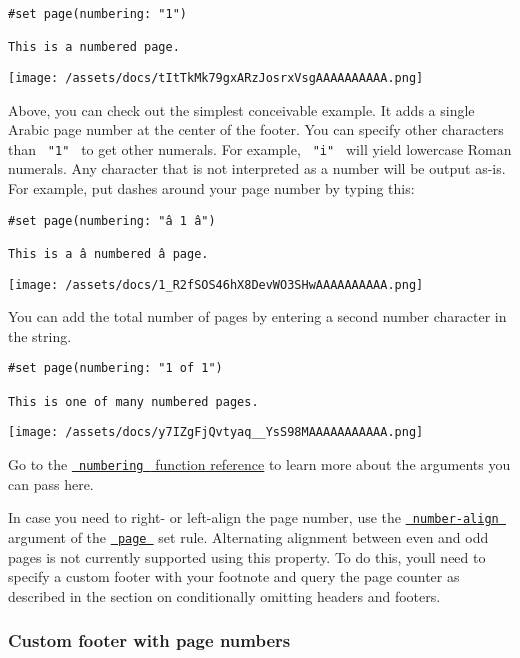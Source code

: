\begin{verbatim}
#set page(numbering: "1")

This is a numbered page.
\end{verbatim}

\texttt{[image: /assets/docs/tItTkMk79gxARzJosrxVsgAAAAAAAAAA.png]}

Above, you can check out the simplest conceivable example. It adds a
single Arabic page number at the center of the footer. You can specify
other characters than \texttt{\ "1"\ } to get other numerals. For
example, \texttt{\ "i"\ } will yield lowercase Roman numerals. Any
character that is not interpreted as a number will be output as-is. For
example, put dashes around your page number by typing this:

\begin{verbatim}
#set page(numbering: "â 1 â")

This is a â numbered â page.
\end{verbatim}

\texttt{[image: /assets/docs/1\_R2fSOS46hX8DevWO3SHwAAAAAAAAAA.png]}

You can add the total number of pages by entering a second number
character in the string.

\begin{verbatim}
#set page(numbering: "1 of 1")

This is one of many numbered pages.
\end{verbatim}

\texttt{[image: /assets/docs/y7IZgFjQvtyaq\_\_YsS98MAAAAAAAAAAA.png]}

Go to the
\href{/docs/reference/model/numbering/\#parameters-numbering}{\texttt{\ numbering\ }
function reference} to learn more about the arguments you can pass here.

In case you need to right- or left-align the page number, use the
\href{/docs/reference/layout/page/\#parameters-number-align}{\texttt{\ number-align\ }}
argument of the \href{/docs/reference/layout/page/}{\texttt{\ page\ }}
set rule. Alternating alignment between even and odd pages is not
currently supported using this property. To do this,
you\textquotesingle ll need to specify a custom footer with your
footnote and query the page counter as described in the section on
conditionally omitting headers and footers.

\subsubsection{Custom footer with page
numbers}\label{custom-footer-with-page-numbers}

